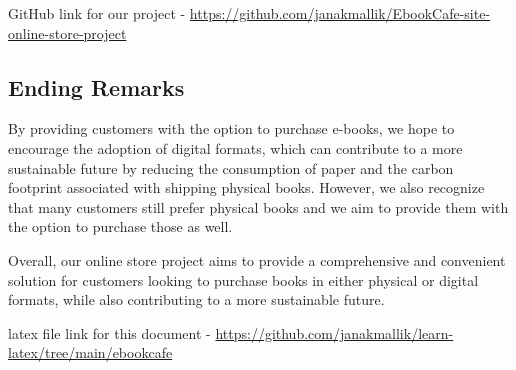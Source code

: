 \documentclass[12pt,a4paper]{article}
\begin{document}
GitHub link for our project - \href{https://github.com/janakmallik/EbookCafe-site-online-store-project}{https://github.com/janakmallik/EbookCafe-site-online-store-project}
\subsection{Ending Remarks}
By providing customers with the option to purchase e-books, we hope to encourage the adoption of digital formats, which can contribute to a more sustainable future by reducing the consumption of paper and the carbon footprint associated with shipping physical books. However, we also recognize that many customers still prefer physical books and we aim to provide them with the option to purchase those as well.

Overall, our online store project aims to provide a comprehensive and convenient solution for customers looking to purchase books in either physical or digital formats, while also contributing to a more sustainable future.

\vspace{2cm}
latex file link for this document - \href{https://github.com/janakmallik/learn-latex/tree/main/ebookcafe}{https://github.com/janakmallik/learn-latex/tree/main/ebookcafe}
\end{document}
